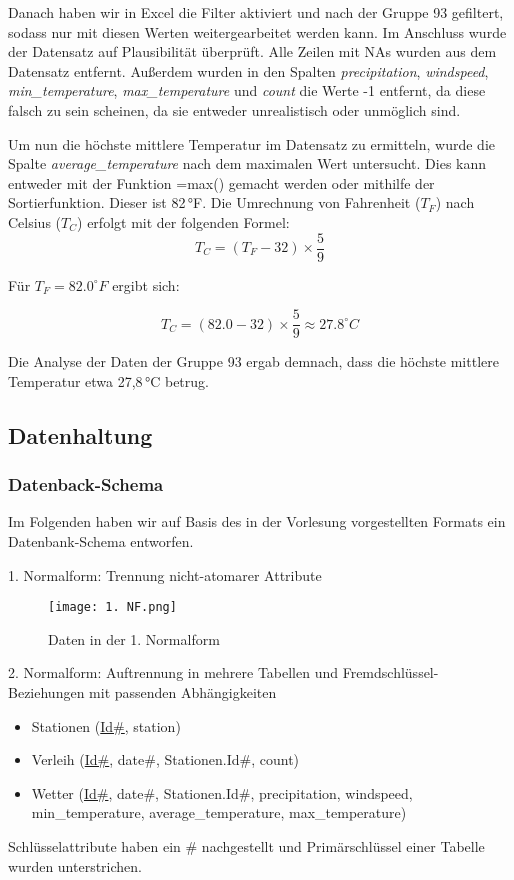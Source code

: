 \documentclass{article}
\begin{document}
    
\noindent Danach haben wir in Excel die Filter aktiviert und nach der Gruppe 93 gefiltert, sodass nur mit diesen Werten weitergearbeitet werden kann. Im Anschluss wurde der Datensatz auf Plausibilität überprüft. Alle Zeilen mit NAs wurden aus dem Datensatz entfernt. Außerdem wurden in den Spalten \textit{precipitation}, \textit{windspeed}, \textit{min\_temperature}, \textit{max\_temperature} und \textit{count} die Werte -1 entfernt, da diese falsch zu sein scheinen, da sie entweder unrealistisch oder unmöglich sind.

\noindent Um nun die höchste mittlere Temperatur im Datensatz zu ermitteln, wurde die Spalte \textit{average\_temperature} nach dem maximalen Wert untersucht. Dies kann entweder mit der Funktion =max() gemacht werden oder mithilfe der Sortierfunktion. Dieser ist 82\,°F. Die Umrechnung von Fahrenheit (\( T_F \)) nach Celsius (\( T_C \)) erfolgt mit der folgenden Formel:
\begin{equation}
\label{eq:3}
T_C = \left(T_F - 32\right) \times \frac{5}{9}
\end{equation}

Für \( T_F = 82.0^\circ F \) ergibt sich:

\[T_C = \left(82.0 - 32\right) \times \frac{5}{9} \approx 27.8^\circ C\]


\noindent Die Analyse der Daten der Gruppe 93 ergab demnach, dass die höchste mittlere Temperatur  etwa 27,8\,°C betrug. 

\subsection{Datenhaltung}
\subsubsection{Datenback-Schema}
Im Folgenden haben wir auf Basis des in der Vorlesung vorgestellten Formats ein Datenbank-Schema entworfen.


1. Normalform: Trennung nicht-atomarer Attribute
\begin{figure}[ht] 
    \centering
    \texttt{[image: 1. NF.png]}
    \caption{Daten in der 1. Normalform}
    \label{fig:5}
    \end{figure}

2. Normalform: Auftrennung in mehrere Tabellen und Fremdschlüssel-Beziehungen mit passenden Abhängigkeiten
\begin{itemize}
    \item Stationen (\underline{Id\#}, station)
    \item Verleih (\underline{Id\#}, date\#, Stationen.Id\#, count)
    \item Wetter (\underline{Id\#}, date\#, Stationen.Id\#, precipitation, windspeed, \\ min\_temperature, average\_temperature, max\_temperature)
\end{itemize}
Schlüsselattribute haben ein \# nachgestellt und Primärschlüssel einer Tabelle wurden unterstrichen.
\end{document}
